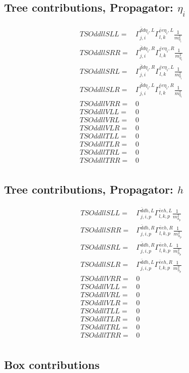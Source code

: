 \documentclass[A4,landscape]{article}
\begin{document}
\subsection{Tree contributions, Propagator: $\eta_i$} 

\begin{align} 
  TSOddllSLL= & \Gamma^{\bar{d}d \eta_i ,L}_{j, i} \Gamma^{\bar{e}e \eta_i ,L}_{l, k} \frac{1}{m^2_{\eta_i}} \\ 
  TSOddllSRR= & \Gamma^{\bar{d}d \eta_i ,R}_{j, i} \Gamma^{\bar{e}e \eta_i ,R}_{l, k} \frac{1}{m^2_{\eta_i}} \\ 
  TSOddllSRL= & \Gamma^{\bar{d}d \eta_i ,R}_{j, i} \Gamma^{\bar{e}e \eta_i ,L}_{l, k} \frac{1}{m^2_{\eta_i}} \\ 
  TSOddllSLR= & \Gamma^{\bar{d}d \eta_i ,L}_{j, i} \Gamma^{\bar{e}e \eta_i ,R}_{l, k} \frac{1}{m^2_{\eta_i}} \\ 
  TSOddllVRR= & 0 \\ 
  TSOddllVLL= & 0 \\ 
  TSOddllVRL= & 0 \\ 
  TSOddllVLR= & 0 \\ 
  TSOddllTLL= & 0 \\ 
  TSOddllTLR= & 0 \\ 
  TSOddllTRL= & 0 \\ 
  TSOddllTRR= & 0 \\ 
\end{align} 
\subsection{Tree contributions, Propagator: $h$} 

\begin{align} 
  TSOddllSLL= & \Gamma^{\bar{d}d h ,L}_{j, i, p} \Gamma^{\bar{e}e h ,L}_{l, k, p} \frac{1}{m^2_{h_{{p}}}} \\ 
  TSOddllSRR= & \Gamma^{\bar{d}d h ,R}_{j, i, p} \Gamma^{\bar{e}e h ,R}_{l, k, p} \frac{1}{m^2_{h_{{p}}}} \\ 
  TSOddllSRL= & \Gamma^{\bar{d}d h ,R}_{j, i, p} \Gamma^{\bar{e}e h ,L}_{l, k, p} \frac{1}{m^2_{h_{{p}}}} \\ 
  TSOddllSLR= & \Gamma^{\bar{d}d h ,L}_{j, i, p} \Gamma^{\bar{e}e h ,R}_{l, k, p} \frac{1}{m^2_{h_{{p}}}} \\ 
  TSOddllVRR= & 0 \\ 
  TSOddllVLL= & 0 \\ 
  TSOddllVRL= & 0 \\ 
  TSOddllVLR= & 0 \\ 
  TSOddllTLL= & 0 \\ 
  TSOddllTLR= & 0 \\ 
  TSOddllTRL= & 0 \\ 
  TSOddllTRR= & 0 \\ 
\end{align} 
\subsection{Box contributions} 
\end{document}
